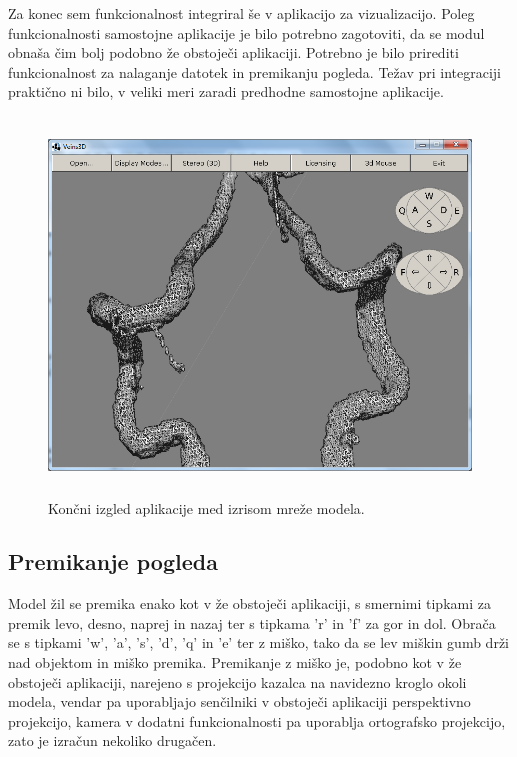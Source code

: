 \documentclass[a4paper, 12pt]{book}
\begin{document}
Za konec sem funkcionalnost integriral še v aplikacijo za vizualizacijo. Poleg funkcionalnosti samostojne aplikacije je bilo potrebno zagotoviti, da se modul obnaša čim bolj podobno že obstoječi aplikaciji. Potrebno je bilo prirediti funkcionalnost za nalaganje datotek in premikanju pogleda. Težav pri integraciji praktično ni bilo, v veliki meri zaradi predhodne samostojne aplikacije.

\begin{figure}[h!]
\begin{center}
\includegraphics[width=\textwidth, height=10cm, keepaspectratio=true]{koncna_implementacija.png}
\end{center}
\caption{Končni izgled aplikacije med izrisom mreže modela.}
\label{renderingartifact}
\end{figure}

\subsection{Premikanje pogleda}

Model žil se premika enako kot v že obstoječi aplikaciji, s smernimi tipkami za premik levo, desno, naprej in nazaj ter s tipkama 'r' in 'f' za gor in dol. Obrača se s tipkami 'w', 'a', 's', 'd', 'q' in 'e' ter z miško, tako da se lev miškin gumb drži nad objektom in miško premika. Premikanje z miško je, podobno kot v že obstoječi aplikaciji, narejeno s projekcijo kazalca na navidezno kroglo okoli modela, vendar pa uporabljajo senčilniki v obstoječi aplikaciji perspektivno projekcijo, kamera v dodatni funkcionalnosti pa uporablja ortografsko projekcijo, zato je izračun nekoliko drugačen.
\end{document}
